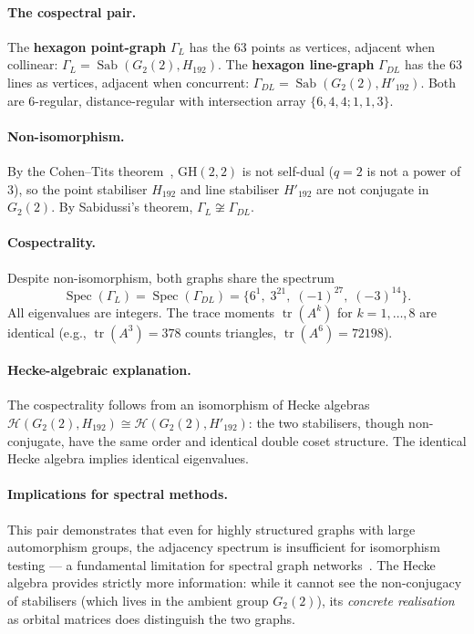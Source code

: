 \documentclass[mlmain]{jmlr}
\newcommand{\Sab}{\operatorname{Sab}}
\newcommand{\GH}{\mathrm{GH}}
\newcommand{\HH}{\mathcal{H}}
\newcommand{\Spec}{\operatorname{Spec}}
\newcommand{\tr}{\operatorname{tr}}
\begin{document}
\paragraph{The cospectral pair.}
The \textbf{hexagon point-graph} $\Gamma_L$ has the 63 points as
vertices, adjacent when collinear: $\Gamma_L = \Sab(G_2(2), H_{192})$.
The \textbf{hexagon line-graph} $\Gamma_{DL}$ has the 63
lines as vertices, adjacent when concurrent:
$\Gamma_{DL} = \Sab(G_2(2), H'_{192})$.
Both are 6-regular, distance-regular with intersection array
$\{6, 4, 4; 1, 1, 3\}$.

\paragraph{Non-isomorphism.}
By the Cohen--Tits theorem~\citep{cohen1985}, $\GH(2,2)$ is
not self-dual ($q=2$ is not a power of 3), so the point
stabiliser $H_{192}$ and line stabiliser $H'_{192}$ are not
conjugate in $G_2(2)$.  By Sabidussi's theorem,
$\Gamma_L \not\cong \Gamma_{DL}$.

\paragraph{Cospectrality.}
Despite non-isomorphism, both graphs share the spectrum
\begin{equation}
\label{eq:cospectral}
  \Spec(\Gamma_L) = \Spec(\Gamma_{DL})
  = \{6^1,\; 3^{21},\; (-1)^{27},\; (-3)^{14}\}.
\end{equation}
All eigenvalues are integers.  The trace moments
$\tr(A^k)$ for $k = 1, \ldots, 8$ are identical
(e.g., $\tr(A^3) = 378$ counts triangles, $\tr(A^6) = 72198$).

\paragraph{Hecke-algebraic explanation.}
The cospectrality follows from an isomorphism of Hecke
algebras $\HH(G_2(2), H_{192}) \cong \HH(G_2(2), H'_{192})$:
the two stabilisers, though non-conjugate, have the same
order and identical double coset structure.
The identical Hecke algebra implies identical eigenvalues.

\paragraph{Implications for spectral methods.}
This pair demonstrates that even for highly structured
graphs with large automorphism groups, the adjacency
spectrum is insufficient for isomorphism testing ---
a fundamental limitation for spectral graph
networks~\citep{xu2019, vandam2003}.
The Hecke algebra provides strictly more information:
while it cannot see the non-conjugacy of stabilisers
(which lives in the ambient group $G_2(2)$), its
\emph{concrete realisation} as orbital matrices does
distinguish the two graphs.
\end{document}
